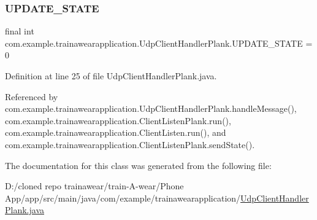 \mbox{\label{classcom_1_1example_1_1trainawearapplication_1_1_udp_client_handler_plank_af27cd7ec8aca34d7c434ddaeb312f907}} 
\subsubsection{\texorpdfstring{UPDATE\_STATE}{UPDATE\_STATE}}
{\footnotesize\ttfamily final int com.\+example.\+trainawearapplication.\+Udp\+Client\+Handler\+Plank.\+U\+P\+D\+A\+T\+E\+\_\+\+S\+T\+A\+TE = 0\hspace{0.3cm}{\ttfamily [static]}}



Definition at line 25 of file Udp\+Client\+Handler\+Plank.\+java.



Referenced by com.\+example.\+trainawearapplication.\+Udp\+Client\+Handler\+Plank.\+handle\+Message(), com.\+example.\+trainawearapplication.\+Client\+Listen\+Plank.\+run(), com.\+example.\+trainawearapplication.\+Client\+Listen.\+run(), and com.\+example.\+trainawearapplication.\+Client\+Listen\+Plank.\+send\+State().



The documentation for this class was generated from the following file\+:\begin{DoxyCompactItemize}
\item 
D\+:/cloned repo trainawear/train-\/\+A-\/wear/\+Phone App/app/src/main/java/com/example/trainawearapplication/\mbox{\hyperlink{_udp_client_handler_plank_8java}{Udp\+Client\+Handler\+Plank.\+java}}\end{DoxyCompactItemize}
